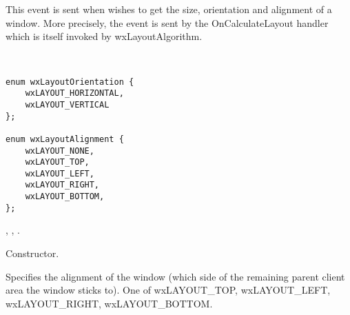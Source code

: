 \section{}\label{wxquerylayoutinfoevent}

This event is sent when  wishes to get
the size, orientation and alignment of a window. More precisely, the event is sent
by the OnCalculateLayout handler which is itself invoked by wxLayoutAlgorithm.


\\


\twocolwidtha{7cm}%
\begin{twocollist}\itemsep=0pt
\end{twocollist}


{\small
\begin{verbatim}
enum wxLayoutOrientation {
    wxLAYOUT_HORIZONTAL,
    wxLAYOUT_VERTICAL
};

enum wxLayoutAlignment {
    wxLAYOUT_NONE,
    wxLAYOUT_TOP,
    wxLAYOUT_LEFT,
    wxLAYOUT_RIGHT,
    wxLAYOUT_BOTTOM,
};
\end{verbatim}
}


,\rtfsp
{},\rtfsp
{}.




Constructor.

\label{wxquerylayoutinfoeventgetalignment}


Specifies the alignment of the window (which side of the remaining parent client area
the window sticks to). One of wxLAYOUT\_TOP, wxLAYOUT\_LEFT, wxLAYOUT\_RIGHT, wxLAYOUT\_BOTTOM.

